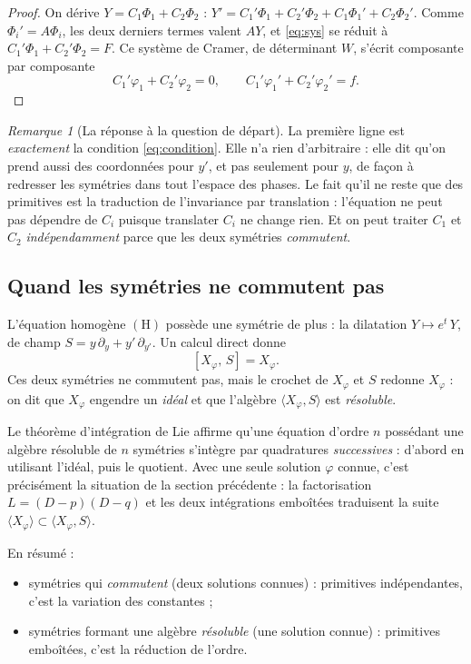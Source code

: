 \documentclass[11pt,a4paper]{article}
\theoremstyle{plain}
\theoremstyle{definition}
\theoremstyle{remark}
\newtheorem{remarque}[theoreme]{Remarque}
\newcommand{\Dx}{D}
\newcommand{\cro}[2]{\left[#1,\,#2\right]}
\begin{document}
\begin{proof}
On dérive $Y = C_1\Phi_1 + C_2\Phi_2$ : $Y' = C_1'\Phi_1 + C_2'\Phi_2 + C_1\Phi_1' + C_2\Phi_2'$. Comme $\Phi_i' = A\Phi_i$, les deux derniers termes valent $AY$, et \eqref{eq:sys} se réduit à $C_1'\Phi_1 + C_2'\Phi_2 = F$. Ce système de Cramer, de déterminant $W$, s'écrit composante par composante
\[
  C_1'\varphi_1 + C_2'\varphi_2 = 0, \qquad C_1'\varphi_1' + C_2'\varphi_2' = f .
\]
\end{proof}

\begin{remarque}[La réponse à la question de départ]
La première ligne est \emph{exactement} la condition \eqref{eq:condition}. Elle n'a rien d'arbitraire : elle dit qu'on prend aussi des coordonnées pour $y'$, et pas seulement pour $y$, de façon à redresser les symétries dans tout l'espace des phases. Le fait qu'il ne reste que des primitives est la traduction de l'invariance par translation : l'équation ne peut pas dépendre de $C_i$ puisque translater $C_i$ ne change rien. Et on peut traiter $C_1$ et $C_2$ \emph{indépendamment} parce que les deux symétries \emph{commutent}.
\end{remarque}

\subsection{Quand les symétries ne commutent pas}

L'équation homogène $(\mathrm{H})$ possède une symétrie de plus : la dilatation $Y \mapsto e^{t}\,Y$, de champ $S = y\,\partial_y + y'\,\partial_{y'}$. Un calcul direct donne
\[
  \cro{X_\varphi}{S} = X_\varphi .
\]
Ces deux symétries ne commutent pas, mais le crochet de $X_\varphi$ et $S$ redonne $X_\varphi$ : on dit que $X_\varphi$ engendre un \emph{idéal} et que l'algèbre $\langle X_\varphi, S\rangle$ est \emph{résoluble}.

Le théorème d'intégration de Lie affirme qu'une équation d'ordre $n$ possédant une algèbre résoluble de $n$ symétries s'intègre par quadratures \emph{successives} : d'abord en utilisant l'idéal, puis le quotient. Avec une seule solution $\varphi$ connue, c'est précisément la situation de la section précédente : la factorisation $L = (\Dx - p)(\Dx - q)$ et les deux intégrations emboîtées traduisent la suite $\langle X_\varphi\rangle \subset \langle X_\varphi, S\rangle$.

En résumé :
\begin{itemize}[nosep]
\item symétries qui \emph{commutent} (deux solutions connues) : primitives indépendantes, c'est la variation des constantes ;
\item symétries formant une algèbre \emph{résoluble} (une solution connue) : primitives emboîtées, c'est la réduction de l'ordre.
\end{itemize}
\end{document}
